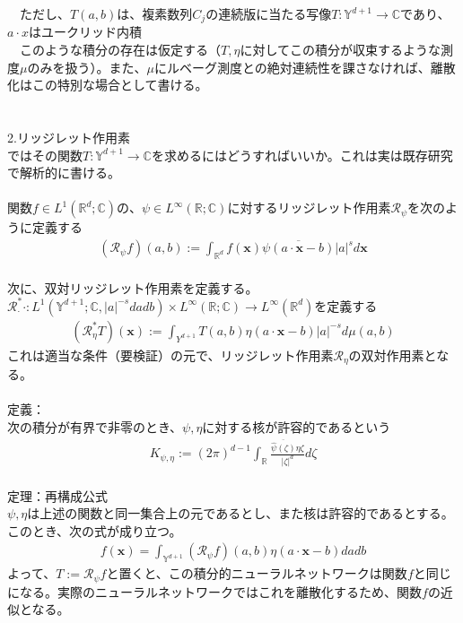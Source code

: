 \documentclass{jsarticle}
\begin{document}
　ただし、$T(a,b)$は、複素数列$C_j$の連続版に当たる写像$T:\mathbb{Y}^{d+1}\rightarrow\mathbb{C}$であり、$a\cdot x$はユークリッド内積\\
　このような積分の存在は仮定する（$T,\eta$に対してこの積分が収束するような測度$\mu$のみを扱う）。また、$\mu$にルベーグ測度との絶対連続性を課さなければ、離散化はこの特別な場合として書ける。\\
　\\
　\\
2.リッジレット作用素\\
ではその関数$T:\mathbb{Y}^{d+1}\rightarrow\mathbb{C}$を求めるにはどうすればいいか。これは実は既存研究で解析的に書ける。\\
　\\
関数$f\in L^1(\mathbb{R}^{d};\mathbb{C})$の、$\psi\in L^\infty(\mathbb{R};\mathbb{C})$に対するリッジレット作用素$\mathcal{R}_\psi$を次のように定義する
\begin{eqnarray}
(\mathcal{R}_\psi f)(a,b):=\int_{\mathbb{R}^{d}}f(\bm{x})\overline{\psi(a\cdot\bm{x}-b)}|a|^sd\bm{x}
\end{eqnarray}
　\\
次に、双対リッジレット作用素を定義する。\\
$\mathcal{R}^*_\cdot \cdot:L^1(\mathbb{Y}^{d+1};\mathbb{C},|a|^{-s}dadb)\times L^\infty(\mathbb{R};\mathbb{C})\rightarrow L^\infty(\mathbb{R}^d)$を定義する
\begin{eqnarray}
(\mathcal{R}^*_\eta T)(\bm{x}):=\int_{Y^{d+1}}T(a,b)\eta(a\cdot\bm{x}-b)|a|^{-s}d\mu(a,b)
\end{eqnarray}
これは適当な条件（要検証）の元で、リッジレット作用素$\mathcal{R}_\eta$の双対作用素となる。\\
　\\
定義：\\
次の積分が有界で非零のとき、$\psi,\eta$に対する核が許容的であるという
\begin{eqnarray}
K_{\psi,\eta}:=(2\pi)^{d-1}\int_\mathbb{R}\frac{\overline{\hat{\psi}(\zeta)}\eta{\zeta}}{|\zeta|^d}d\zeta
\end{eqnarray}
　\\
定理：再構成公式\\
$\psi,\eta$は上述の関数と同一集合上の元であるとし、また核は許容的であるとする。このとき、次の式が成り立つ。
\begin{eqnarray}
f(\bm{x})=\int_{\mathbb{Y}^{d+1}}(\mathcal{R}_\psi f)(a,b)\eta(a\cdot\bm{x}-b)dadb
\end{eqnarray}
よって、$T:=\mathcal{R}_\psi f$と置くと、この積分的ニューラルネットワークは関数$f$と同じになる。実際のニューラルネットワークではこれを離散化するため、関数$f$の近似となる。\\
\end{document}
